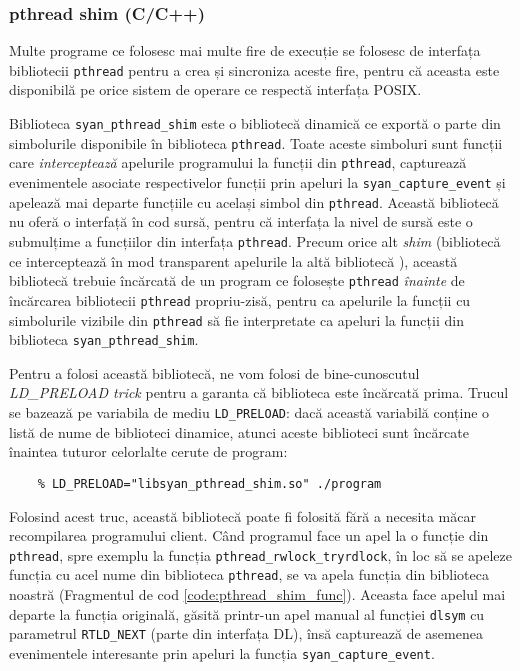 \subsubsection{pthread shim (C/C++)}
Multe programe ce folosesc mai multe fire de execuție se folosesc de
interfața bibliotecii \lstinline{pthread} pentru a crea și sincroniza
aceste fire, pentru că aceasta este disponibilă pe orice sistem de
operare ce respectă interfața POSIX.

Biblioteca \lstinline{syan_pthread_shim} este o bibliotecă dinamică ce
exportă o parte din simbolurile disponibile în biblioteca
\lstinline{pthread}. Toate aceste simboluri sunt funcții care
\textit{interceptează} apelurile programului la funcții din
\lstinline{pthread}, capturează evenimentele asociate respectivelor
funcții prin apeluri la \lstinline{syan_capture_event} și apelează mai
departe funcțiile cu același simbol din \lstinline{pthread}. Această
bibliotecă nu oferă o interfață în cod sursă, pentru că interfața la
nivel de sursă este o submulțime a funcțiilor din interfața
\lstinline{pthread}. Precum orice alt \textit{shim} (bibliotecă ce
interceptează în mod transparent apelurile la altă bibliotecă
\cite{wiki:Shim_(computing)}), această bibliotecă trebuie încărcată de
un program ce folosește \lstinline{pthread} \textit{înainte} de
încărcarea bibliotecii \lstinline{pthread} propriu-zisă, pentru ca
apelurile la funcții cu simbolurile vizibile din \lstinline{pthread} să
fie interpretate ca apeluri la funcții din biblioteca
\lstinline{syan_pthread_shim}.

Pentru a folosi această bibliotecă, ne vom folosi de bine-cunoscutul
\textit{LD\_PRELOAD trick}\cite{LD_PRELOAD} pentru a garanta că
biblioteca este încărcată prima. Trucul se bazează pe variabila de mediu
\lstinline{LD_PRELOAD}: dacă această variabilă conține o listă de nume
de biblioteci dinamice, atunci aceste biblioteci sunt încărcate înaintea
tuturor celorlalte cerute de program:
\begin{lstlisting}
    % LD_PRELOAD="libsyan_pthread_shim.so" ./program
\end{lstlisting}
Folosind acest truc, această bibliotecă poate fi folosită fără a
necesita măcar recompilarea programului client. Când programul face
un apel la o funcție din \lstinline{pthread}, spre exemplu la funcția
\lstinline{pthread_rwlock_tryrdlock}, în loc să se apeleze funcția cu
acel nume din biblioteca \lstinline{pthread}, se va apela funcția din
biblioteca noastră (Fragmentul de cod \ref{code:pthread_shim_func}).
Aceasta face apelul mai departe la funcția originală, găsită printr-un
apel manual al funcției \lstinline{dlsym} cu parametrul
\lstinline{RTLD_NEXT} (parte din interfața DL\cite{DL}), însă capturează
de asemenea evenimentele interesante prin apeluri la funcția
\lstinline{syan_capture_event}.

